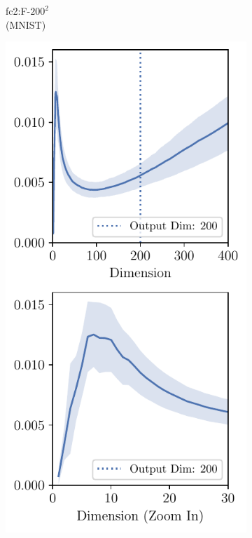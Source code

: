 \begin{figure}[h]
\begin{subfigure}[b]{0.23\textwidth}
        \caption{fc2:F-$200^2$\\(MNIST)}
        \label{fig:app_adexp_overlap_early_mnistfc2}
    \end{subfigure}
    \begin{subfigure}[b]{0.23\textwidth}
        \centering
        \captionsetup{justification=centering}
        \includegraphics[width=\textwidth]{Appendix_Figures/Overlap_large_model/FailCases/early/CIFAR10_VGG11W200_fxlr0.01_conv5_zoom_stacked.pdf}

\end{subfigure}
\end{figure}
